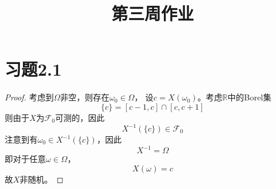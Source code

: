 \documentclass[cn]{homework}
\title{第三周作业}
\begin{document}
    \maketitle

    \section{习题2.1}
    \begin{proof}
        考虑到$\Omega$非空，则存在$\omega_0\in\Omega$，
        设$c=X(\omega_0)$。考虑$\mathbb R$中的Borel集
        \[\{c\}=[c-1,c]\cap[c,c+1]\]
        则由于$X$为$\mathcal F_0$可测的，因此
        \[X^{-1}(\{c\})\in\mathcal F_0\]
        注意到有$\omega_0\in X^{-1}(\{c\})$，因此
        \[X^{-1}=\Omega\]
        即对于任意$\omega\in\Omega$，
        \[X(\omega)=c\]
        故$X$非随机。
    \end{proof}
\end{document}
